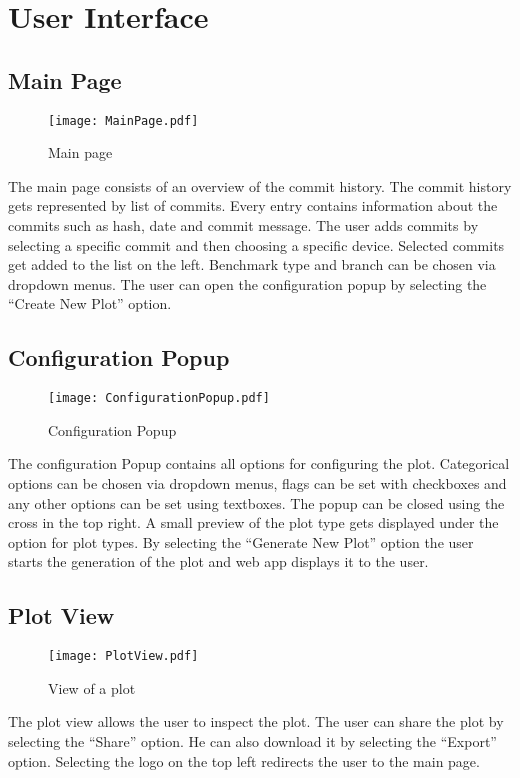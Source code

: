 \section{User Interface}

\subsection{Main Page}

\begin{figure}[H]
    \texttt{[image: MainPage.pdf]}
    \caption{Main page}
    \label{ui:main}
\end{figure}

The main page consists of an overview of the commit history. The commit history gets represented by list of commits. Every entry contains information about the commits such as hash, date and commit message. The user adds commits by selecting a specific commit and then choosing a specific device. Selected commits get added to the list on the left. Benchmark type and branch can be chosen via dropdown menus. The user can open the configuration popup by selecting the \enquote{Create New Plot} option.

\subsection{Configuration Popup}

\begin{figure}[H]
    \texttt{[image: ConfigurationPopup.pdf]}
    \caption{Configuration Popup}
    \label{ui:config}
\end{figure}

The configuration Popup contains all options for configuring the \gls{plot}. Categorical options can be chosen via dropdown menus, flags can be set with checkboxes and any other options can be set using textboxes. The popup can be closed using the cross in the top right. A small preview of the plot type gets displayed under the option for plot types. By selecting the \enquote{Generate New Plot} option the user starts the generation of the \gls{plot} and web app displays it to the user.

\subsection{Plot View}

\begin{figure}[H]
    \texttt{[image: PlotView.pdf]}
    \caption{View of a \gls{plot}}
    \label{ui:plot}
\end{figure}

The plot view allows the user to inspect the \gls{plot}. The user can share the \gls{plot} by selecting the \enquote{Share} option. He can also download it by selecting the \enquote{Export} option. Selecting the logo on the top left redirects the user to the main page.
